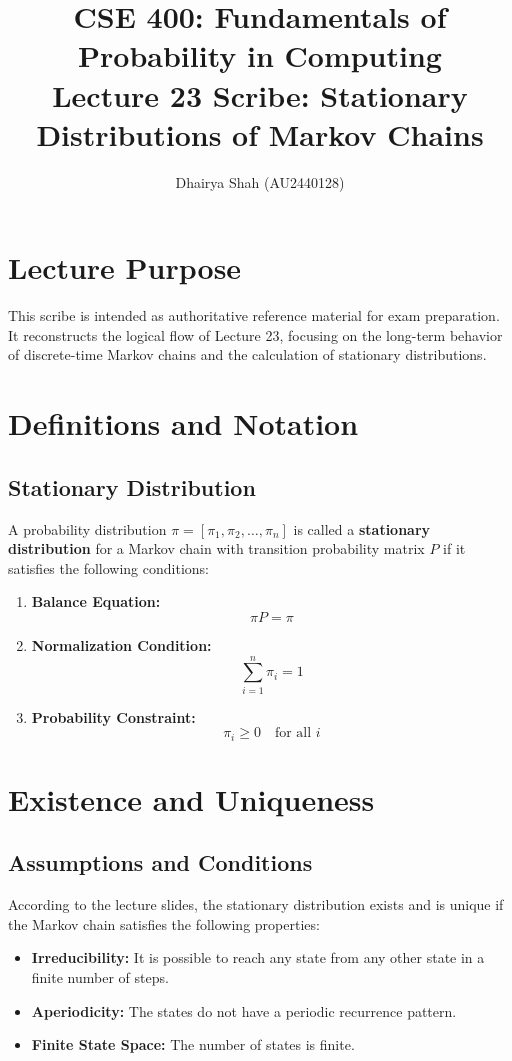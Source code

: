 \documentclass[11pt]{article}
\title{CSE 400: Fundamentals of Probability in Computing \\ \textbf{Lecture 23 Scribe: Stationary Distributions of Markov Chains}}
\author{Dhairya Shah (AU2440128)}
\date{}
\begin{document}
\maketitle

\section*{Lecture Purpose}
This scribe is intended as authoritative reference material for exam preparation. It reconstructs the logical flow of Lecture 23, focusing on the long-term behavior of discrete-time Markov chains and the calculation of stationary distributions.

\section{Definitions and Notation}
\subsection{Stationary Distribution}
A probability distribution $\pi = [\pi_1, \pi_2, \dots, \pi_n]$ is called a \textbf{stationary distribution} for a Markov chain with transition probability matrix $P$ if it satisfies the following conditions:
\begin{enumerate}
    \item \textbf{Balance Equation:} 
    \[ \pi P = \pi \]
    \item \textbf{Normalization Condition:} 
    \[ \sum_{i=1}^{n} \pi_i = 1 \]
    \item \textbf{Probability Constraint:} 
    \[ \pi_i \ge 0 \quad \text{for all } i \]
\end{enumerate}

\section{Existence and Uniqueness}
\subsection{Assumptions and Conditions}
According to the lecture slides, the stationary distribution exists and is unique if the Markov chain satisfies the following properties:
\begin{itemize}
    \item \textbf{Irreducibility:} It is possible to reach any state from any other state in a finite number of steps.
    \item \textbf{Aperiodicity:} The states do not have a periodic recurrence pattern.
    \item \textbf{Finite State Space:} The number of states is finite.
\end{itemize}
\end{document}
